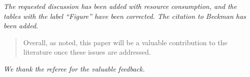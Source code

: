 \documentclass{article}
\theoremstyle{plain} \newtheorem{lemma}{Lemma}
\begin{document}
{\it The requested discussion has been added with resource consumption, and
the tables with the label ``Figure'' have been corrected. The citation to
Beckman has been added.}

\begin{quote}
Overall, as noted, this paper will be a valuable contribution to the
literature once these issues are addressed.
\end{quote}

{\it We thank the referee for the valuable feedback.}



\end{document}
